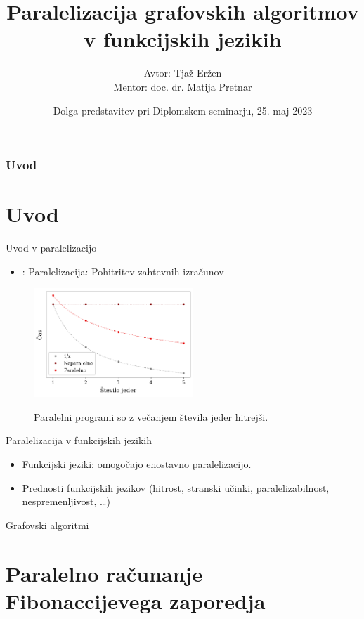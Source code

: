 \documentclass{beamer}
\title[Paralelizacija grafovskih algoritmov v funkcijskih jezikih]
{Paralelizacija grafovskih algoritmov v funkcijskih jezikih}
\author[Avtor: Tjaž Eržen, Mentor: doc. dr. Matija Pretnar]
{Avtor: Tjaž Eržen\\Mentor: doc. dr. Matija Pretnar}
\date[25. maj 2023]
{Dolga predstavitev pri Diplomskem seminarju, 25. maj 2023}
\begin{document}
\begin{frame}
  \titlepage
\end{frame}

\begin{frame}
  \frametitle{Uvod}
  \tableofcontents
\end{frame}

\section{Uvod}

\begin{frame}{Uvod v paralelizacijo}
    \begin{itemize}
        \item: Paralelizacija: Pohitritev zahtevnih izračunov
    \end{itemize}
    \begin{figure}
        \caption{Paralelni programi so z večanjem števila jeder hitrejši.}
        \includegraphics[width=6cm]{slike/cilj-casovne-zahtevnosti-paralelizacije.png}
        \label{fig:cilj-casovne-zahtevnosti-paralelizacije}
    \end{figure}
\end{frame}


\begin{frame}{Paralelizacija v funkcijskih jezikih}
    \begin{itemize}
        \item Funkcijski jeziki: omogočajo enostavno paralelizacijo.
        \item Prednosti funkcijskih jezikov (hitrost, stranski učinki, paralelizabilnost, nespremenljivost, \dots)
    \end{itemize}
\end{frame}

\begin{frame}{Grafovski algoritmi}

\end{frame}


\section{Paralelno računanje Fibonaccijevega zaporedja}
\end{document}
